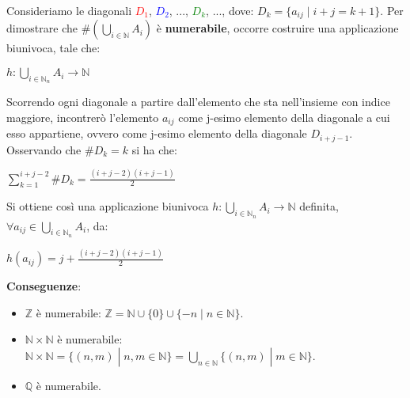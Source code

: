 Consideriamo le diagonali \textcolor{red}{$D_1$}, \textcolor{blue}{$D_2$}, ..., \textcolor{green}{$D_k$}, ..., dove: $D_k = \{a_{ij} \; | \; i + j = k + 1\}$. Per dimostrare che $\#(\bigcup_{i \in \mathbb{N}}A_i)$ è \textbf{numerabile}, occorre costruire una applicazione biunivoca, tale che:
\begin{center}
    $h : \bigcup_{i \in \mathbb{N}_n} A_i \rightarrow \mathbb{N}$
\end{center}
Scorrendo ogni diagonale a partire dall'elemento che sta nell'insieme con indice maggiore, incontrerò l'elemento $a_{ij}$ come j-esimo elemento della diagonale a cui esso appartiene, ovvero come j-esimo elemento della diagonale $D_{i+j-1}$. \\
Osservando che $\#D_k = k$ si ha che:
\begin{center}
    $\sum_{k=1}^{i+j-2}\#D_k = \frac{(i + j - 2)(i + j - 1)}{2}$
\end{center}
Si ottiene così una applicazione biunivoca $h : \bigcup_{i \in \mathbb{N}_n}A_i \rightarrow \mathbb{N}$ definita, $\forall a_{ij} \in \bigcup_{i \in \mathbb{N}_n} A_i$, da:
\begin{center}
    $h(a_{ij}) = j + \frac{(i + j - 2)(i + j - 1)}{2}$
\end{center}

\textbf{Conseguenze}:
\begin{itemize}
    \item $\mathbb{Z}$ è numerabile: $\mathbb{Z} = \mathbb{N} \cup \{0\} \cup \{ -n \; | \; n \in \mathbb{N}\}$.
    \item $\mathbb{N} \times \mathbb{N}$ è numerabile: $\mathbb{N} \times \mathbb{N} = \{(n, m) \; | \; n, m \in \mathbb{N}\} = \bigcup_{n \in \mathbb{N}} \{(n, m) \; | \; m \in \mathbb{N}\}$.
    \item $\mathbb{Q}$ è numerabile.
\end{itemize}


